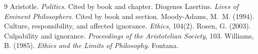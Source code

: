 \documentclass{situationist-preprint}
\begin{document}
\begin{thebibliography}{9}\small
{} Aristotle. \emph{Politics}. Cited by book and chapter.
 Diogenes Laertius. \emph{Lives of Eminent Philosophers}. Cited by book and section.
 Moody-Adams, M.~M. (1994). Culture, responsibility, and affected ignorance. \emph{Ethics}, 104(2).
 Rosen, G. (2003). Culpability and ignorance. \emph{Proceedings of the Aristotelian Society}, 103.
 Williams, B. (1985). \emph{Ethics and the Limits of Philosophy}. Fontana.
\end{thebibliography}
\end{document}
